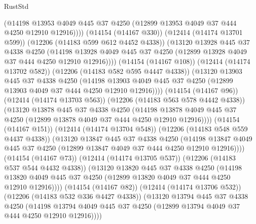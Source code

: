 \begin{lexlean}{RustStd}
\begin{coremodule}
                    (@14198
                      @13953
                      @4049
                      @445
                      @37
                      @4250
                      (@12899 @13953 @4049 @37 @444 @4250 @12910 @12916))))
                (@14154 (@14167 @330))
                (@12414 (@14174 @13701 @599))
                (@12206 (@14183 @599 @612 @4452 @4338))
                (@13120
                  @13928
                  @445
                  @37
                  @4338
                  @4250
                  (@14198
                    @13928
                    @4049
                    @445
                    @37
                    @4250
                    (@12899 @13928 @4049 @37 @444 @4250 @12910 @12916))))
              (@14154 (@14167 @108))
              (@12414 (@14174 @13702 @582))
              (@12206 (@14183 @582 @595 @4447 @4338))
              (@13120
                @13903
                @445
                @37
                @4338
                @4250
                (@14198
                  @13903
                  @4049
                  @445
                  @37
                  @4250
                  (@12899 @13903 @4049 @37 @444 @4250 @12910 @12916))))
            (@14154 (@14167 @96))
            (@12414 (@14174 @13703 @563))
            (@12206 (@14183 @563 @578 @4442 @4338))
            (@13120
              @13878
              @445
              @37
              @4338
              @4250
              (@14198
                @13878
                @4049
                @445
                @37
                @4250
                (@12899 @13878 @4049 @37 @444 @4250 @12910 @12916))))
          (@14154 (@14167 @151))
          (@12414 (@14174 @13704 @548))
          (@12206 (@14183 @548 @559 @4437 @4338))
          (@13120
            @13847
            @445
            @37
            @4338
            @4250
            (@14198
              @13847
              @4049
              @445
              @37
              @4250
              (@12899 @13847 @4049 @37 @444 @4250 @12910 @12916))))
        (@14154 (@14167 @73))
        (@12414 (@14174 @13705 @537))
        (@12206 (@14183 @537 @544 @4432 @4338))
        (@13120
          @13820
          @445
          @37
          @4338
          @4250
          (@14198 @13820 @4049 @445 @37 @4250 (@12899 @13820 @4049 @37 @444 @4250 @12910 @12916))))
      (@14154 (@14167 @82))
      (@12414 (@14174 @13706 @532))
      (@12206 (@14183 @532 @336 @4427 @4338))
      (@13120
        @13794
        @445
        @37
        @4338
        @4250
        (@14198 @13794 @4049 @445 @37 @4250 (@12899 @13794 @4049 @37 @444 @4250 @12910 @12916))))

\end{coremodule}
\end{lexlean}
